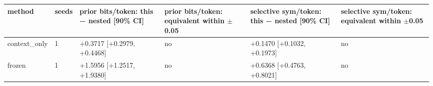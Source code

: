 \begin{tabular}{llllll}
\hline
method & seeds & prior bits/token: this − nested [90\% CI] & prior bits/token: equivalent within $\pm$0.05 & selective sym/token: this − nested [90\% CI] & selective sym/token: equivalent within $\pm$0.05 \\
\hline
context\_only & 1 & +0.3717 [+0.2979, +0.4468] & no & +0.1470 [+0.1032, +0.1973] & no \\
frozen & 1 & +1.5956 [+1.2517, +1.9380] & no & +0.6368 [+0.4763, +0.8021] & no \\
\hline
\end{tabular}
